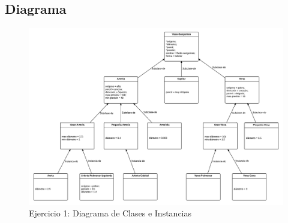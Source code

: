 \documentclass[10pt, a4paper,spanish]{article}
\begin{document}
			\begin{figure}[H]
				\centering
        
			\end{figure}

			\begin{figure}[H]
				\centering
        
			\end{figure}

			\begin{figure}[H]
				\centering
        
			\end{figure}


			\begin{figure}[H]
				\centering
        
			\end{figure}


			\begin{figure}[H]
				\centering
        
			\end{figure}

		\subsection{Diagrama}

			\begin{figure}[H]
				\begin{center}
					\includegraphics[width=\textwidth]{exercise-1-diagram}
					\caption{Ejercicio 1: Diagrama de Clases e Instancias}
					\label{image:diagram-1}
				\end{center}
			\end{figure}
\end{document}
